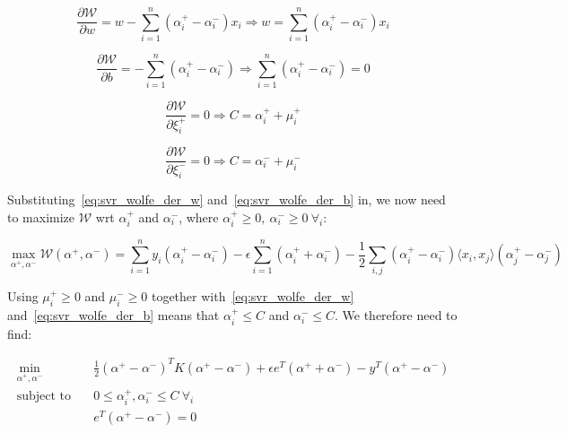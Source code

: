\begin{equation} \label{eq:svr_wolfe_der_w}
	\frac{\partial \mathcal{W}}{\partial w}=w-\sum_{i=1}^n (\alpha_i^+ - \alpha_i^-) x_i \Rightarrow w=\sum_{i=1}^n (\alpha_i^+ - \alpha_i^-) x_i
\end{equation}

\begin{equation} \label{eq:svr_wolfe_der_b}
	\frac{\partial \mathcal{W}}{\partial b}=-\sum_{i=1}^n (\alpha_i^+ - \alpha_i^-)\Rightarrow \sum_{i=1}^n (\alpha_i^+ - \alpha_i^-)=0
\end{equation}

\begin{equation}\label{eq:svr_wolfe_der_xip}
	\frac{\partial \mathcal{W}}{\partial\xi_i^+}=0\Rightarrow C=\alpha_i^+ + \mu_i^+
\end{equation}

\begin{equation} \label{eq:svr_wolfe_der_xim}
	\frac{\partial \mathcal{W}}{\partial\xi_i^-}=0\Rightarrow C=\alpha_i^- + \mu_i^-
\end{equation}

Substituting~\eqref{eq:svr_wolfe_der_w} and~\eqref{eq:svr_wolfe_der_b} in, we now need to maximize $\mathcal{W}$ wrt $\alpha_i^+$ and $\alpha_i^-$, where $\alpha_i^+ \geq 0,\ \alpha_i^- \geq 0 \ \forall_i$:

\begin{equation} \label{eq:svr_max_wolfe_dual}
    \max_{\alpha^+,\alpha^-} \mathcal{W}(\alpha^+,\alpha^-) = \sum_{i=1}^n y_i(\alpha_i^+ - \alpha_i^-)-\epsilon\sum_{i=1}^n (\alpha_i^+ + \alpha_i^-)-\frac{1}{2}\sum_{i,j}(\alpha_i^+ - \alpha_i^-)\langle x_i, x_j \rangle(\alpha_j ^+ - \alpha_j ^-)
\end{equation}

Using $\mu_i^+ \geq 0$ and $\mu_i^- \geq 0$ together with~\eqref{eq:svr_wolfe_der_w} and~\eqref{eq:svr_wolfe_der_b} means that $\alpha_i^+ \leq C$ and $\alpha_i^- \leq C$. We therefore need to find:

\begin{equation} \label{eq:svr_min_wolfe_dual}
    \begin{aligned}
        \min_{\alpha^+,\alpha^-} \quad & \frac{1}{2}(\alpha^+ - \alpha^-)^TK(\alpha^+ - \alpha^-)+\epsilon e^T(\alpha^+ + \alpha^-)-y^T(\alpha^+ - \alpha^-) \\
            \text{subject to} \quad & 0\leq\alpha_i^+,\alpha_i^- \leq C \ \forall_i \\ & e^T(\alpha^+ - \alpha^-)=0
    \end{aligned}
\end{equation}

